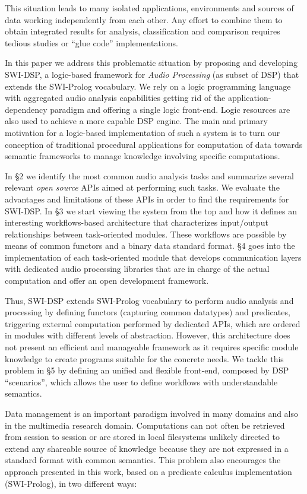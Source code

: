 \documentclass[runningheads]{llncs}
\begin{document}
This situation leads to many isolated applications, environments and sources of data working independently from each other. Any effort to combine them to obtain integrated results for analysis, classification and comparison requires tedious studies or ``glue code'' implementations.

In this paper we address this problematic situation by proposing and developing SWI-DSP, a logic-based framework for \textit{Audio Processing} (as subset of DSP) that extends the SWI-Prolog vocabulary. We rely on a logic programming language with aggregated audio analysis capabilities getting rid of the application-dependency paradigm and offering a single logic front-end. Logic resources are also used to achieve a more capable DSP engine. The main and primary motivation for a logic-based implementation of such a system is to turn our conception of traditional procedural applications for computation of data towards semantic frameworks to manage knowledge involving specific computations.

In \S 2 we identify the most common audio analysis tasks and summarize several relevant \textit{open source} APIs aimed at performing such tasks. We evaluate the advantages and limitations of these APIs in order to find the requirements for SWI-DSP. In \S 3 we start viewing the system from the top and how it defines an interesting workflows-based architecture that characterizes input/output relationships between task-oriented modules. These workflows are possible by means of common functors and a binary data standard format. \S 4 goes into the implementation of each task-oriented module that develops communication layers with dedicated audio processing libraries that are in charge of the actual computation and offer an open development framework.

Thus, SWI-DSP extends SWI-Prolog vocabulary to perform audio analysis and processing by defining functors (capturing common datatypes) and predicates, triggering external computation performed by dedicated APIs, which are ordered in modules with different levels of abstraction. However, this architecture does not present an efficient and manageable framework as it requires specific module knowledge to create programs suitable for the concrete needs. We tackle this problem in \S 5 by defining an unified and flexible front-end, composed by DSP ``scenarios'', which allows the user to define workflows with understandable semantics.

Data management is an important paradigm involved in many domains and also in the multimedia research domain. Computations can not often be retrieved from session to session or are stored in local filesystems unlikely directed to extend any shareable source of knowledge because they are not expressed in a standard format with common semantics. This problem also encourages the approach presented in this work, based on a predicate calculus implementation (SWI-Prolog), in two different ways:
\end{document}
